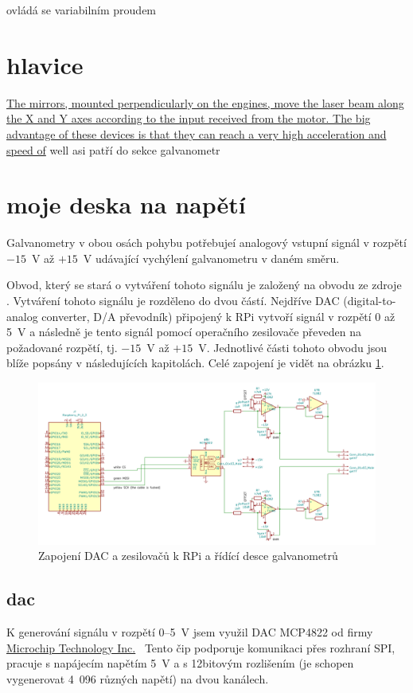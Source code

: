 ovládá se variabilním proudem

\section{hlavice}
\href{https://elenlaser.com/blog/galvo-head-laser-focus-tool.html}{The mirrors, mounted perpendicularly on the engines, move the laser beam along the X and Y axes according to the input received from the motor.
The big advantage of these devices is that they can reach a very high acceleration and speed of}
well asi patří do sekce galvanometr

\section{moje deska na napětí}
Galvanometry v obou osách pohybu potřebujeí analogový vstupní signál v rozpětí $-15$~V až $+15$~V udávající vychýlení galvanometru v daném směru.

Obvod, který se stará o vytváření tohoto signálu je založený na obvodu ze zdroje \cite{lasershow-with-real-galvos}.
Vytváření tohoto signálu je rozděleno do dvou částí. Nejdříve DAC (digital-to-analog converter, D/A převodník) připojený k RPi vytvoří signál v rozpětí 0 až 5~V a následně je tento signál pomocí operačního zesilovače převeden na požadované rozpětí, tj. $-15$~V až $+15$~V.
Jednotlivé části tohoto obvodu jsou blíže popsány v následujících kapitolách. Celé zapojení je vidět na obrázku \ref{fig:dac_board}.
\begin{figure}[!htb]
  \centering
  \includegraphics[width=1\textwidth]{img/dac_board.png} 
  \caption{\label{fig:dac_board}Zapojení DAC a zesilovačů k RPi a řídící desce galvanometrů}
\end{figure}

\subsection{dac}
K generování signálu v rozpětí 0--5~V jsem využil DAC MCP4822 od firmy \href{https://www.microchip.com}{Microchip Technology Inc.}\ 
Tento čip podporuje komunikaci přes rozhraní SPI, pracuje s napájecím napětím 5~V a s 12bitovým rozlišením (je schopen vygenerovat 4~096 různých napětí) na dvou kanálech.

